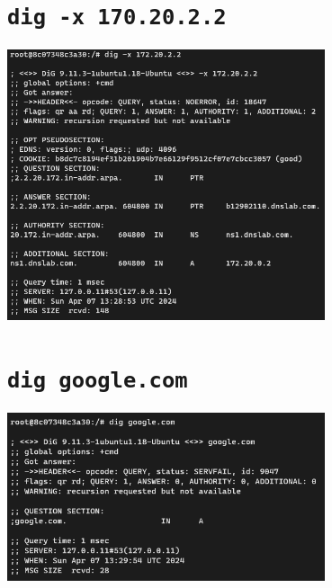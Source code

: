 \documentclass[12pt, a4paper]{article}
\begin{document}
  \section{\texttt{dig -x 170.20.2.2}}
  \includegraphics[width=0.7\textwidth]{24-04-07_21-28-42_WindowsTerminal_H7dpF5VzTX.png}

  \section{\texttt{dig google.com}}
  \includegraphics[width=0.7\textwidth]{24-04-07_21-30-43_WindowsTerminal_nIcmxB1x6K.png}
\end{document}
